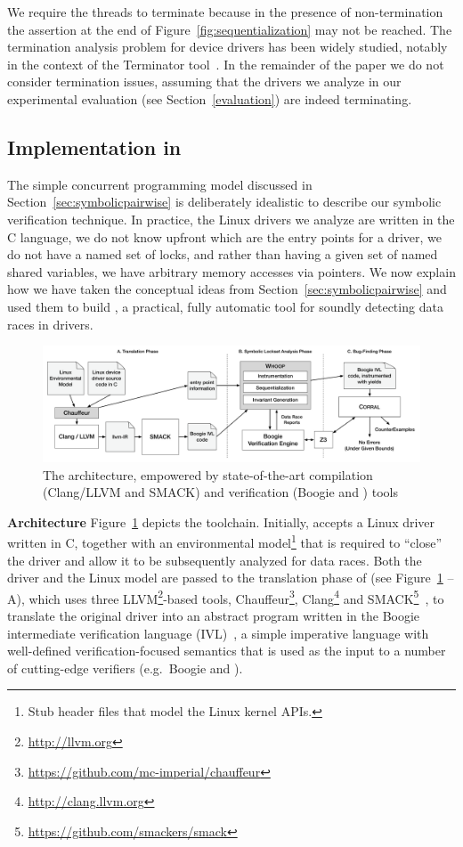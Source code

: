 We require the threads to terminate because in the presence of non-termination the assertion at the end of Figure~\ref{fig:sequentialization} may not be reached.  The termination analysis problem for device drivers has been widely studied, notably in the context of the Terminator tool~\cite{cook2006termination}. In the remainder of the paper we do not consider termination issues, assuming that the drivers we analyze in our experimental evaluation (see Section~\ref{evaluation}) are indeed terminating.

\subsection{Implementation in \whoop}
\label{sec:implementation}

The simple concurrent programming model discussed in Section~\ref{sec:symbolicpairwise} is deliberately idealistic to describe our symbolic verification technique. In practice, the Linux drivers we analyze are written in the C language, we do not know upfront which are the entry points for a driver, we do not have a named set of locks, and rather than having a given set of named shared variables, we have arbitrary memory accesses via pointers. We now explain how we have taken the conceptual ideas from Section~\ref{sec:symbolicpairwise} and used them to build \whoop, a practical, fully automatic tool for soundly detecting data races in drivers.

\begin{figure}
\centering
\includegraphics[width=.99\linewidth]{img/whoop.pdf}
\caption{The \whoop architecture, empowered by state-of-the-art compilation (Clang/LLVM and SMACK) and verification (Boogie and \corral) tools}
\label{fig:whoop}
\end{figure}

\medskip\noindent\textbf{Architecture }
%
Figure~\ref{fig:whoop} depicts the \whoop toolchain. Initially, \whoop accepts a Linux driver written in C, together with an environmental model\footnote{Stub header files that model the Linux kernel APIs.} that is required to ``close'' the driver and allow it to be subsequently analyzed for data races. Both the driver and the Linux model are passed to the translation phase of \whoop (see Figure~\ref{fig:whoop} -- A), which uses three LLVM\footnote{\url{http://llvm.org}}-based tools, Chauffeur\footnote{\url{https://github.com/mc-imperial/chauffeur}}, Clang\footnote{\url{http://clang.llvm.org}} and SMACK\footnote{\url{https://github.com/smackers/smack}}~\cite{rakamaric2014smack}, to translate the original driver into an abstract program written in the Boogie intermediate verification language (IVL)~\cite{deline2005boogiepl}, a simple imperative language with well-defined verification-focused semantics that is used as the input to a number of cutting-edge verifiers (e.g.\ Boogie and \corral).

